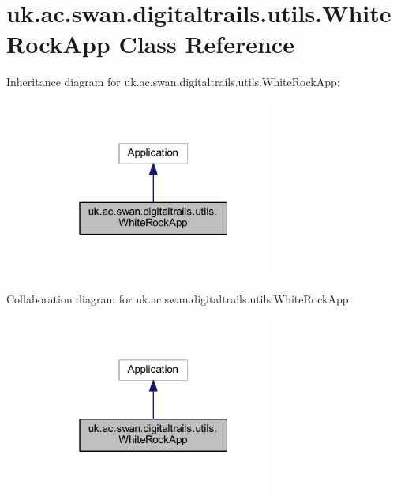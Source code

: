\hypertarget{classuk_1_1ac_1_1swan_1_1digitaltrails_1_1utils_1_1_white_rock_app}{\section{uk.\+ac.\+swan.\+digitaltrails.\+utils.\+White\+Rock\+App Class Reference}
\label{classuk_1_1ac_1_1swan_1_1digitaltrails_1_1utils_1_1_white_rock_app}
}


Inheritance diagram for uk.\+ac.\+swan.\+digitaltrails.\+utils.\+White\+Rock\+App\+:\nopagebreak
\begin{figure}[H]
\begin{center}
\leavevmode
\includegraphics[width=220pt]{classuk_1_1ac_1_1swan_1_1digitaltrails_1_1utils_1_1_white_rock_app__inherit__graph}
\end{center}
\end{figure}


Collaboration diagram for uk.\+ac.\+swan.\+digitaltrails.\+utils.\+White\+Rock\+App\+:\nopagebreak
\begin{figure}[H]
\begin{center}
\leavevmode
\includegraphics[width=220pt]{classuk_1_1ac_1_1swan_1_1digitaltrails_1_1utils_1_1_white_rock_app__coll__graph}
\end{center}
\end{figure}
